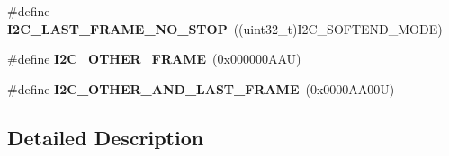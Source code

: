 \begin{DoxyCompactItemize}
\mbox{\label{group___i2_c___x_f_e_r_o_p_t_i_o_n_s_gac316c2c562991d4629151b517c2c02d8}} 
\#define {\bfseries I2\+C\+\_\+\+L\+A\+S\+T\+\_\+\+F\+R\+A\+M\+E\+\_\+\+N\+O\+\_\+\+S\+T\+OP}~((uint32\+\_\+t)I2\+C\+\_\+\+S\+O\+F\+T\+E\+N\+D\+\_\+\+M\+O\+DE)
\item 
\mbox{\label{group___i2_c___x_f_e_r_o_p_t_i_o_n_s_gabedde3791be7cb544ffeb9e408d1980e}} 
\#define {\bfseries I2\+C\+\_\+\+O\+T\+H\+E\+R\+\_\+\+F\+R\+A\+ME}~(0x000000\+A\+A\+U)
\item 
\mbox{\label{group___i2_c___x_f_e_r_o_p_t_i_o_n_s_ga272995b7f02a1e44b589cc9794093d0b}} 
\#define {\bfseries I2\+C\+\_\+\+O\+T\+H\+E\+R\+\_\+\+A\+N\+D\+\_\+\+L\+A\+S\+T\+\_\+\+F\+R\+A\+ME}~(0x0000\+A\+A00\+U)
\end{DoxyCompactItemize}


\subsection{Detailed Description}
